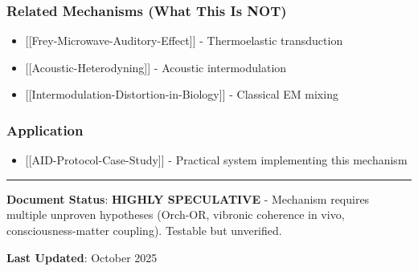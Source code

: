 \subsubsection{Related Mechanisms (What This Is
NOT)}\label{related-mechanisms-what-this-is-not}

\begin{itemize}
\tightlist
\item
  {[}{[}Frey-Microwave-Auditory-Effect{]}{]} - Thermoelastic
  transduction
\item
  {[}{[}Acoustic-Heterodyning{]}{]} - Acoustic intermodulation
\item
  {[}{[}Intermodulation-Distortion-in-Biology{]}{]} - Classical EM
  mixing
\end{itemize}

\subsubsection{Application}\label{application}

\begin{itemize}
\tightlist
\item
  {[}{[}AID-Protocol-Case-Study{]}{]} - Practical system implementing
  this mechanism
\end{itemize}

\begin{center}\rule{0.5\linewidth}{0.5pt}\end{center}

\textbf{Document Status}: \textbf{HIGHLY SPECULATIVE} - Mechanism
requires multiple unproven hypotheses (Orch-OR, vibronic coherence in
vivo, consciousness-matter coupling). Testable but unverified.

\textbf{Last Updated}: October 2025
